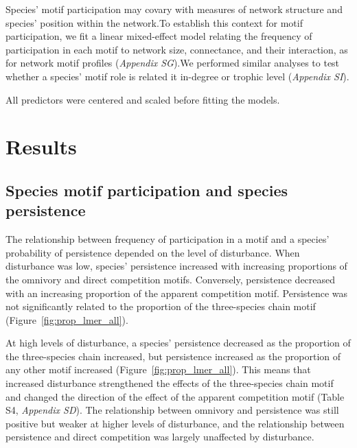 \documentclass[12pt]{article}
\begin{document}
\begin{spacing}{2.0}
            Species' motif participation may covary with measures of network structure and species' position within the network.To establish this context for motif participation, we fit a linear mixed-effect model relating the frequency of participation in each motif to network size, connectance, and their interaction, as for network motif profiles (\emph{Appendix SG}).We performed similar analyses to test whether a species' motif role is related it in-degree or trophic level (\emph{Appendix SI}).
   
            All predictors were centered and scaled before fitting the models. 
\section*{Results}


    \subsection*{Species motif participation and species persistence} 
    
       The relationship between frequency of participation in a motif and a species' probability of persistence depended on the level of disturbance. 
       When disturbance was low, species' persistence increased with increasing proportions of the omnivory and direct competition motifs. 
       Conversely, persistence decreased with an increasing proportion of the apparent competition motif. 
       Persistence was not significantly related to the proportion of the three-species chain motif (Figure~\ref{fig:prop_lmer_all}).
            
            
        At high levels of disturbance, a species' persistence decreased as the proportion of the three-species chain increased, but persistence increased as the proportion of any other motif increased (Figure~\ref{fig:prop_lmer_all}). 
        This means that increased disturbance strengthened the effects of the three-species chain motif and changed the direction of the effect of the apparent competition motif  (Table S4, \emph{Appendix SD}).
        The relationship between omnivory and persistence was still positive but weaker at higher levels of disturbance, and the relationship between persistence and direct competition was largely unaffected by disturbance.
    

\end{spacing}
\end{document}
